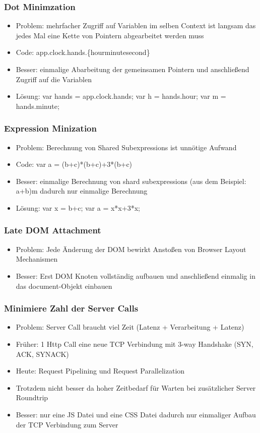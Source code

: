 \documentclass{article} %
\begin{document}
	\subsubsection{Dot Minimzation}
	\begin{itemize}
		\item Problem: mehrfacher Zugriff auf Variablen im selben Context ist langsam das jedes Mal eine Kette von Pointern abgearbeitet werden muss
		\item Code: app.clock.hands.\{hour\textbar minute\textbar second\}
		\item Besser: einmalige Abarbeitung der gemeinsamen Pointern und anschließend Zugriff auf die Variablen
		\item Lösung: var hands = app.clock.hands; var h = hands.hour; var m = hands.minute;
	\end{itemize}
	\subsubsection{Expression Minization}
	\begin{itemize}
		\item Problem: Berechnung von Shared Subexpressions ist unnötige Aufwand
		\item Code: var a = (b+c)*(b+c)+3*(b+c)
		\item Besser: einmalige Berechnung von shard subexpressions (aus dem Beispiel: a+b)m dadurch nur einmalige Berechnung
		\item Lösung: var x = b+c; var a = x*x+3*x;
	\end{itemize}
	\subsubsection{Late DOM Attachment}
	\begin{itemize}
		\item Problem: Jede Änderung der DOM bewirkt Anstoßen von Browser Layout Mechanismen
		\item Besser: Erst DOM Knoten vollständig aufbauen und anschließend einmalig in das document-Objekt einbauen
	\end{itemize}
	\subsubsection{Minimiere Zahl der Server Calls}
	\begin{itemize}
		\item Problem: Server Call braucht viel Zeit (Latenz + Verarbeitung + Latenz)
		\item Früher: 1 Http Call eine neue TCP Verbindung mit 3-way Handshake (SYN, ACK, SYNACK)
		\item Heute: Request Pipelining und Request Parallelization
		\item Trotzdem nicht besser da hoher Zeitbedarf für Warten bei zusätzlicher Server Roundtrip
		\item Besser: nur eine JS Datei und eine CSS Datei dadurch nur einmaliger Aufbau der TCP Verbindung zum Server
	\end{itemize}
\end{document}
